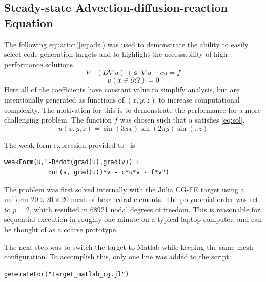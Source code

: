 \documentclass[twoside,leqno,twocolumn]{article}
\begin{document}
\subsection{Steady-state Advection-diffusion-reaction Equation}
The following equation(\ref{eq:adr}) was used to demonstrate the ability to easily select code generation targets and to highlight the accessability of high performance solutions. 
\begin{equation}
\label{eq:adr}
\nabla \cdot (D\nabla u) + \textbf{s} \cdot \nabla u - c u = f
\end{equation}
\[
u(x\in \partial \Omega) = 0
\]
Here all of the coefficients have constant value to simplify analysis, but are intentionally generated as functions of $(x,y,z)$ to increase computational complexity. The motivation for this is to demonstrate the performance for a more challenging problem. The function $f$ was chosen such that $u$ satisfies \ref{eq:sol}.
\begin{equation}
\label{eq:sol}
u(x,y,z) = \sin(3\pi x) \sin(2\pi y) \sin(\pi z)
\end{equation}

The weak form expression provided to \FMshop\ is
\begin{verbatim}
weakForm(u,"-D*dot(grad(u),grad(v)) + 
            dot(s, grad(u))*v - c*u*v - f*v")
\end{verbatim}

The problem was first solved internally with the Julia CG-FE target using a uniform $20\times 20\times 20$ mesh of hexahedral elements. The polynomial order was set to $p=2$, which resulted in 68921 nodal degrees of freedom. This is reasonable for sequential execution in roughly one minute on a typical laptop computer, and can be thought of as a coarse prototype.

The next step was to switch the target to Matlab while keeping the same mesh configuration. To accomplish this, only one line was added to the script: \begin{verbatim}
generateFor("target_matlab_cg.jl")
\end{verbatim}
 
\end{document}
